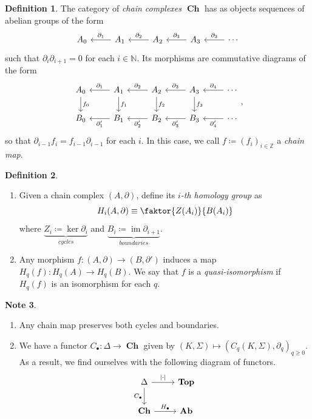 \documentclass[10pt,letterpaper,cm]{nupset}
\theoremstyle{definition}
\newtheorem{definition}{Definition}[subsection]
\newtheorem{note}[definition]{Note}
\theoremstyle{theorem}
\theoremstyle{remark}
\newcommand{\N}{\mathbb N}
\newcommand{\Z}{\mathbb Z}
\newcommand{\1}{\mathbb{1}}
\newcommand{\0}{\vec 0}
\DeclareMathOperator{\im}{im}
\DeclareMathOperator{\ch}{\mathbf{Ch}}
\begin{document}
\begin{definition}
The category of \textit{chain complexes $\ch$} has as objects sequences of abelian groups of the form 
\[
\begin{tikzcd}
A_0 & A_1 \arrow[l, "\partial_1"'] & A_2 \arrow[l, "\partial_2"'] & A_3 \arrow[l, "\partial_3"'] & \cdots \arrow[l, "\partial_3"']
\end{tikzcd}
\] such that $\partial_i\partial_{i+1} =0$ for each $i\in \N$. Its morphisms are commutative diagrams of the form
\[
\begin{tikzcd}
A_0 \arrow[d, "f_0"] & A_1 \arrow[l, "\partial_1"'] \arrow[d, "f_1"] & A_2 \arrow[l, "\partial_2"'] \arrow[d, "f_2"] & A_3 \arrow[l, "\partial_3"'] \arrow[d, "f_3"] & \cdots \arrow[l, "\partial_4"'] \\
B_0 & B_1 \arrow[l, "\partial'_1"] & B_2 \arrow[l, "\partial'_2"] & B_3 \arrow[l, "\partial'_3"] & \cdots \arrow[l, "\partial'_4"]
\end{tikzcd}
,\] so that  $\partial_{i-1}f_i = f_{i-1}\partial_{i-1}$ for each $i$. In this case, we call $f\coloneqq  \left(f_i\right)_{i\in \Z}$ a \textit{chain map}.
\end{definition}

\begin{definition} $ $
\begin{enumerate}
\item Given a chain complex $\left(A, \partial\right)$, define its \textit{$i$-th homology group} as $$ H_i(A, \partial) \equiv \faktor{Z(A_i)}{B(A_i)} $$ where $\underbrace{Z_i \coloneqq  \ker{\partial_{i}}}_{\textit{cycles}}$ and $\underbrace{B_i \coloneqq  \im{\partial_{i+1}}}_{\textit{boundaries}}$. 
\item Any morphism $f: (A, \partial) \to (B, \partial ')$ induces a map $H_q(f) : H_q(A) \to H_q(B)$. We say that $f$ is a \textit{quasi-isomorphism} if $H_q(f)$ is an isomorphism for each $q$. 
\end{enumerate}
\end{definition}

\begin{note} $ $
\begin{enumerate}
\item Any chain map preserves both cycles and boundaries.
\item We have a functor $C_{\bullet}: \Delta \to \ch$ given by $\left(K, \Sigma\right) \mapsto \left(C_q(K, \Sigma), \partial_{q}\right)_{q\geq 0}$. As a result, we find ourselves with the following diagram of functors.
\[
\begin{tikzcd}
\Delta \arrow[d, "C_{\bullet}"'] \arrow[r, "\left\lvert{\cdot}\right\rvert"] & \mathbf{Top} \\
\ch \arrow[r, "H_{\bullet}"] & \mathbf{Ab}
\end{tikzcd}
\]
\end{enumerate}
\end{note}
\end{document}
